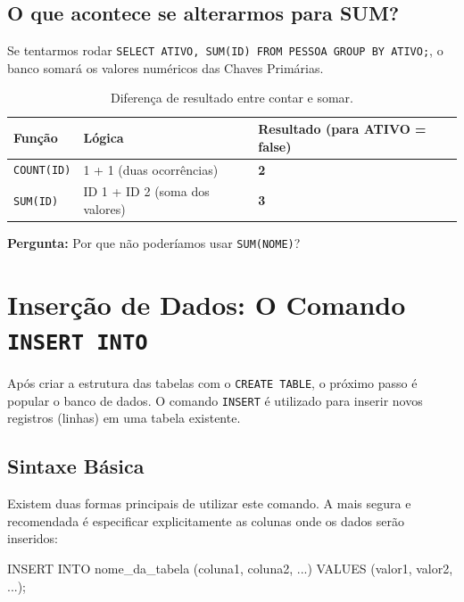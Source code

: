 \subsection{O que acontece se alterarmos para SUM?}

Se tentarmos rodar \texttt{SELECT ATIVO, SUM(ID) FROM PESSOA GROUP BY ATIVO;}, o banco somará os valores numéricos das Chaves Primárias.

\begin{table}[H]
    \centering
    \begin{tabular}{|l|l|l|}
    \hline
    \textbf{Função} & \textbf{Lógica} & \textbf{Resultado (para ATIVO = false)} \\ \hline
    \texttt{COUNT(ID)} & 1 + 1 (duas ocorrências) & \textbf{2} \\ \hline
    \texttt{SUM(ID)} & ID 1 + ID 2 (soma dos valores) & \textbf{3} \\ \hline
    \end{tabular}
    \caption{Diferença de resultado entre contar e somar.}
\end{table}



\begin{tcolorbox}[colback=orange!5,colframe=orange!70!black,title=Reflexão para o Aluno]
\textbf{Pergunta:} Por que não poderíamos usar \texttt{SUM(NOME)}?
\end{tcolorbox}


\section{Inserção de Dados: O Comando \texttt{INSERT INTO}}

Após criar a estrutura das tabelas com o \texttt{CREATE TABLE}, o próximo passo é popular o banco de dados. O comando \texttt{INSERT} é utilizado para inserir novos registros (linhas) em uma tabela existente.



\subsection{Sintaxe Básica}

Existem duas formas principais de utilizar este comando. A mais segura e recomendada é especificar explicitamente as colunas onde os dados serão inseridos:

\begin{sqlcode}
INSERT INTO nome_da_tabela (coluna1, coluna2, ...)
VALUES (valor1, valor2, ...);
\end{sqlcode}

